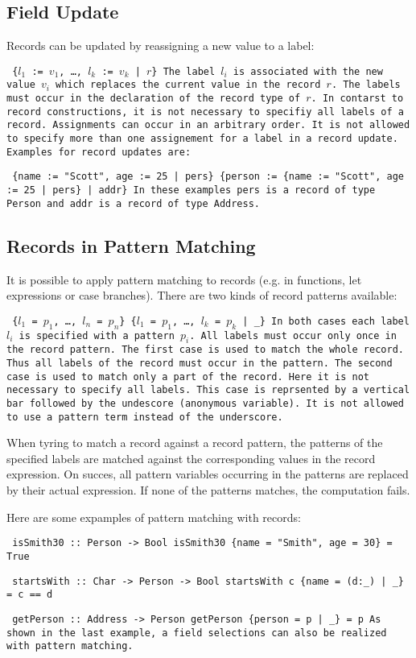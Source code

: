 \documentclass[11pt,fleqn]{article}
\makeatletter
\newenvironment{prog}{\par\vspace{1.5ex}
\setlength{\parindent}{1.0cm}
\setlength{\parskip}{-0.1ex}
\obeylines\@vobeyspaces\tt}{\vspace{1.5ex}\noindent
}
\newcommand{\startprog}{\begin{prog}}
\newcommand{\stopprog}{\end{prog}\noindent}
\newcommand{\pr}[1]{\mbox{\tt #1}}   %
\makeatother
\begin{document}
\subsection{Field Update}
\label{sec-fieldupd}

Records can be updated by reassigning a new value to a label:
\startprog
\{$l_1$ := $v_1$, \ldots, $l_k$ := $v_k$ | $r$\}
\stopprog
The label $l_i$ is associated with the new value $v_i$ which
replaces the current value in the record $r$.
The labels must occur in the declaration 
of the record type of $r$. In contarst to record constructions,
it is not necessary to specifiy all labels of a record. 
Assignments can occur in an arbitrary order. It is not allowed to 
specify more than one assignement for a label in a record update.
Examples for record updates are:
\startprog
\{name := "Scott", age := 25 | pers\}
\{person := \{name := "Scott", age := 25 | pers\} | addr\}
\stopprog
In these examples \pr{pers} is a record of type \pr{Person} and \pr{addr}
is a record of type \pr{Address}. 


\subsection{Records in Pattern Matching}
\label{sec-recsinpm}

It is possible to apply pattern matching to records (e.g. in functions,
let expressions or case branches). There are two kinds of record patterns
available:
\startprog
\{$l_1$ = $p_1$, \ldots, $l_n$ = $p_n$\}
\{$l_1$ = $p_1$, \ldots, $l_k$ = $p_k$ | _\}
\stopprog
In both cases each label $l_i$ is specified with a pattern $p_i$. 
All labels must occur only once in the record pattern.
The first case is used to match the whole record. Thus all labels
of the record must occur in the pattern. 
The second case is used to match only a part of
the record. Here it is not necessary to specify all labels.
This case is reprsented by a vertical bar followed by the undescore
(anonymous variable). It is
not allowed to use a pattern term instead of the underscore.


When tyring to match a record against a record pattern, the 
patterns of the specified labels are matched against 
the corresponding values in the record expression. On succes, all pattern
variables occurring in the patterns are replaced by their actual expression.
If none of the patterns matches, the computation fails.


Here are some expamples of pattern matching with records:
\startprog
isSmith30 :: Person -> Bool
isSmith30 \{name = "Smith", age = 30\} = True
\stopprog
\startprog
startsWith :: Char -> Person -> Bool
startsWith c \{name = (d:_) | _\} = c == d
\stopprog
\startprog
getPerson :: Address -> Person
getPerson \{person = p | _\} = p
\stopprog
As shown in the last example, a field selections can also be realized with
pattern matching.
\end{document}
